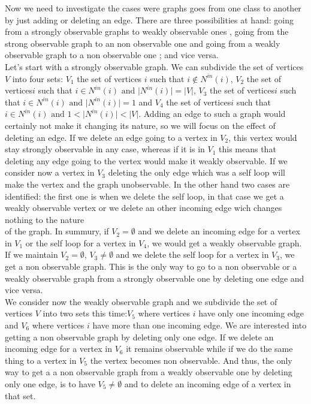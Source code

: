 \documentclass{article} %
\begin{document}
Now we need to investigate the cases were graphs goes from one class to another by just adding or deleting an edge. There are three possibilities at hand: going from a strongly observable graphs to weakly observable ones , going from the strong observable graph to an non observable one and going from a weakly observable graph to a non observable one ; and vice versa.\\

 Let's start with a strongly observable graph. We can subdivide the set of vertices $V$  into four sets: $V_1$ the set of vertices $i$ such that  $i \notin N^{in}(i)$, $V_2$ the set of vertices$i$ such that  $i \in N^{in}(i) \text{ and } \vert N^{in}(i)\vert=\vert V \vert$, $V_3$ the set of vertices$i$ such that  $i \in N^{in}(i) \text{ and } \vert N^{in}(i)\vert=1$ and $V_4$ the set of vertices$i$ such that  $i \in N^{in}(i) \text{ and } 1<\vert N^{in}(i)\vert<\vert V \vert$. Adding an edge to such a graph would certainly not make it changing its nature, so we will focus on the effect of deleting an edge. If we delete an edge going to a vertex in $V_2$, this vertex would stay strongly observable in any case, whereas if it is in $V_1$ this means that deleting any edge going to the vertex would make it weakly observable. If we consider now a vertex in $V_3$ deleting the only edge which was a self loop will make the vertex and the graph unobservable. In the other hand two cases are identified: the first one is when we delete the self loop, in that case we get a weakly observable vertex or we delete an other incoming edge wich changes nothing to the nature\\
  of the graph. In summury, if $V_2= \emptyset$ and we delete an incoming edge for a vertex in $V_1$ or the self loop for a vertex in $V_4$, we would get a weakly observable graph. If we maintain  $V_2= \emptyset$, $V_3 \neq \emptyset$ and we delete the self loop for a vertex in $V_3$, we get a non observable graph. This is the only way to go to a non observable or a weakly observable graph from a strongly observable one by deleting one edge and vice versa.\\
  
  We consider now the weakly observable graph and we subdivide the set of vertices $V$ into two sets this time:$V_5$ where vertices $i$ have only one incoming edge and $V_6$ where vertices $i$ have more than one incoming edge. We are interested into getting a non observable graph by deleting only one edge. If we delete an incoming edge for a vertex in $V_6$ it remains observable while if we do the same thing to a vertex in $V_5$ the vertex becomes non observable. And thus, the only way to get a a non observable graph from a weakly observable one by deleting only one edge, is to have $V_5 \neq \emptyset$ and to delete an incoming edge of a vertex in that set.\\
  
\end{document}
